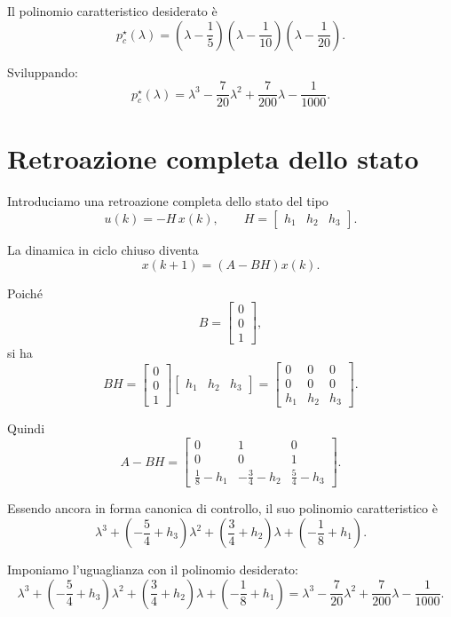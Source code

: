Il polinomio caratteristico desiderato è
\[
p_c^\star(\lambda)
=
\left(\lambda-\frac15\right)
\left(\lambda-\frac1{10}\right)
\left(\lambda-\frac1{20}\right).
\]

Sviluppando:
\[
p_c^\star(\lambda)
=
\lambda^3
-\frac{7}{20}\lambda^2
+\frac{7}{200}\lambda
-\frac{1}{1000}.
\]

\section{Retroazione completa dello stato}

Introduciamo una retroazione completa dello stato del tipo
\[
u(k)=-H\,x(k),
\qquad
H=
\begin{bmatrix}
h_1 & h_2 & h_3
\end{bmatrix}.
\]

La dinamica in ciclo chiuso diventa
\[
x(k+1)=(A-BH)x(k).
\]

Poiché
\[
B=
\begin{bmatrix}
0\\0\\1
\end{bmatrix},
\]
si ha
\[
BH=
\begin{bmatrix}
0\\0\\1
\end{bmatrix}
\begin{bmatrix}
h_1 & h_2 & h_3
\end{bmatrix}
=
\begin{bmatrix}
0 & 0 & 0\\
0 & 0 & 0\\
h_1 & h_2 & h_3
\end{bmatrix}.
\]

Quindi
\[
A-BH=
\begin{bmatrix}
0 & 1 & 0\\
0 & 0 & 1\\
\frac18-h_1 & -\frac34-h_2 & \frac54-h_3
\end{bmatrix}.
\]

Essendo ancora in forma canonica di controllo, il suo polinomio caratteristico è
\[
\lambda^3
+\left(-\frac54+h_3\right)\lambda^2
+\left(\frac34+h_2\right)\lambda
+\left(-\frac18+h_1\right).
\]

Imponiamo l'uguaglianza con il polinomio desiderato:
\[
\lambda^3
+\left(-\frac54+h_3\right)\lambda^2
+\left(\frac34+h_2\right)\lambda
+\left(-\frac18+h_1\right)
=
\lambda^3-\frac{7}{20}\lambda^2+\frac{7}{200}\lambda-\frac{1}{1000}.
\]

